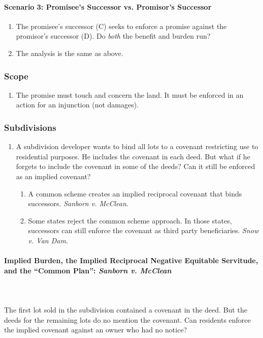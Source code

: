 \paragraph{Scenario 3: Promisee's Successor vs. Promisor's Successor}

\begin{enumerate}
    \item The promisee's successor (C) seeks to enforce a promise against the 
    promisor's successor (D). Do \emph{both} the benefit and burden run?
    \item The analysis is the same as above.
\end{enumerate}

\subsubsection{Scope}

\begin{enumerate}
    \item The promise must touch and concern the land. It must be enforced in 
    an action for an injunction (not damages).
\end{enumerate}

\subsubsection{Subdivisions}

\begin{enumerate}
    \item A subdivision developer wants to bind all lots to a covenant 
    restricting use to residential purposes. He includes the covenant in each 
    deed. But what if he forgets to include the covenant in some of the deeds? 
    Can it still be enforced as an implied covenant?
    \begin{enumerate}
        \item A common scheme creates an implied reciprocal covenant that 
        binds successors. \emph{Sanborn v. McClean}.
        \item Some states reject the common scheme approach. In those states, 
        successors can still enforce the covenant as third party 
        beneficiaries. \emph{Snow v. Van Dam}.
    \end{enumerate}
\end{enumerate}

\paragraph{Implied Burden, the Implied Reciprocal Negative Equitable 
Servitude, and the ``Common Plan'': \emph{Sanborn v. McClean}}
~\\\\
The first lot sold in the subdivision contained a covenant in the deed. But 
the deeds for the remaining lots do no mention the covenant. Can residents 
enforce the implied covenant against an owner who had no notice?


